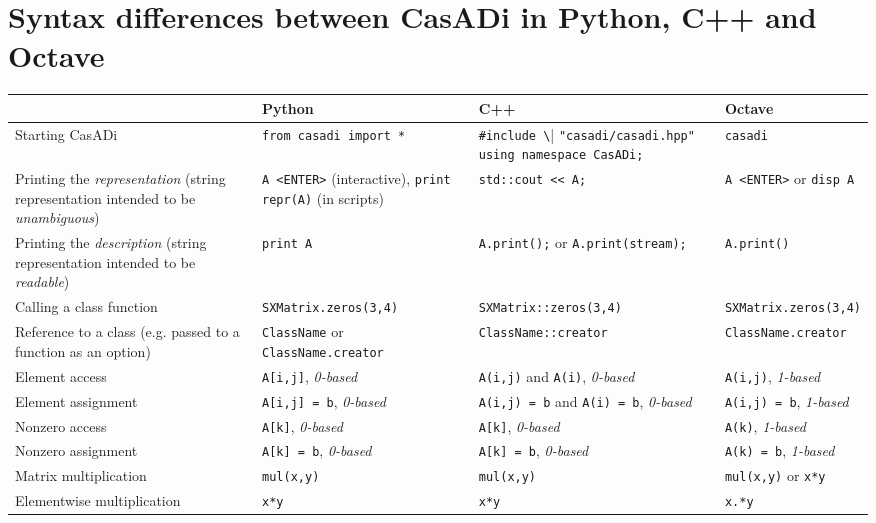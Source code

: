 \documentclass[a4paper,12pt]{book}
\begin{document}
{\chapter{Syntax differences between CasADi in Python, C++ and Octave}\label{sec:syntax_differences}
\scriptsize
\begin{center}
  \begin{tabular}{| p{3.5cm} | p{3.5cm} | p{3.5cm} | p{3.5cm} | }
    \hline
      & Python & C++ & Octave \\ \hline
    Starting CasADi & \verb|from casadi import *| & \verb|#include \| \verb|"casadi/casadi.hpp"| \verb|using namespace CasADi;| & \verb|casadi| \\ \hline
    Printing the \emph{representation} (string representation intended to be \emph{unambiguous}) & \verb|A <ENTER>| (interactive), \verb|print repr(A)| (in scripts) & \verb|std::cout << A;|& \verb|A <ENTER>| or \verb|disp A|\\ \hline
    Printing the \emph{description} (string representation intended to be \emph{readable}) & \verb|print A| & \verb|A.print();| or \verb|A.print(stream);|& \verb|A.print()| \\ \hline
    Calling a class function & \verb|SXMatrix.zeros(3,4)| & \verb|SXMatrix::zeros(3,4)| & \verb|SXMatrix.zeros(3,4)|\\ \hline
    Reference to a class (e.g. passed to a function as an option) & \verb|ClassName| or \verb|ClassName.creator| & \verb|ClassName::creator| & \verb|ClassName.creator|\\ \hline
    Element access & \verb|A[i,j]|, \emph{0-based} & \verb|A(i,j)| and \verb|A(i)|, \emph{0-based} & \verb|A(i,j)|, \emph{1-based} \\ \hline
    Element assignment & \verb|A[i,j] = b|, \emph{0-based} & \verb|A(i,j) = b| and \verb|A(i) = b|, \linebreak \emph{0-based} & \verb|A(i,j) = b|, \emph{1-based} \\ \hline
    Nonzero access & \verb|A[k]|, \emph{0-based} & \verb|A[k]|, \emph{0-based} & \verb|A(k)|, \emph{1-based} \\ \hline
    Nonzero assignment & \verb|A[k] = b|, \emph{0-based} & \verb|A[k] = b|, \emph{0-based} & \verb|A(k) = b|, \emph{1-based} \\ \hline
    Matrix multiplication & \verb|mul(x,y)| & \verb|mul(x,y)| & \verb|mul(x,y)| or \verb|x*y| \\ \hline
    Elementwise multiplication & \verb|x*y| & \verb|x*y| & \verb|x.*y| \\ \hline

\end{tabular}
\end{center}}
\end{document}
